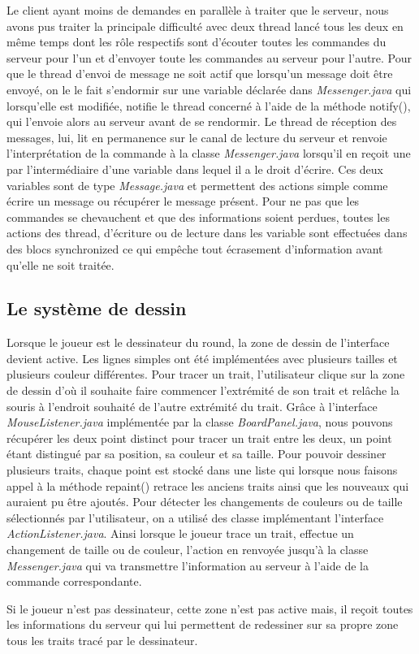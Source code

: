 \documentclass[a4paper, 11pt]{article}
\begin{document}
Le client ayant moins de demandes en parallèle à traiter que le
serveur, nous avons pus traiter la principale difficulté avec deux
thread lancé tous les deux en même temps dont les rôle respectifs sont
d'écouter toutes les commandes du serveur pour l'un et d'envoyer toute
les commandes au serveur pour l'autre.  Pour que le thread d'envoi de
message ne soit actif que lorsqu'un message doit être envoyé, on le le
fait s'endormir sur une variable déclarée dans \textit{Messenger.java}
qui lorsqu'elle est modifiée, notifie le thread concerné à l'aide de
la méthode notify(), qui l'envoie alors au serveur avant de se
rendormir.  Le thread de réception des messages, lui, lit en
permanence sur le canal de lecture du serveur et renvoie
l'interprétation de la commande à la classe \textit{Messenger.java}
lorsqu'il en reçoit une par l'intermédiaire d'une variable dans lequel
il a le droit d'écrire.  Ces deux variables sont de type
\textit{Message.java} et permettent des actions simple comme écrire un
message ou récupérer le message présent.  Pour ne pas que les
commandes se chevauchent et que des informations soient perdues,
toutes les actions des thread, d'écriture ou de lecture dans les
variable sont effectuées dans des blocs synchronized ce qui empêche
tout écrasement d'information avant qu'elle ne soit traitée.

\subsection{Le système de dessin}

Lorsque le joueur est le dessinateur du round, la zone de dessin de
l'interface devient active. Les lignes simples ont été implémentées
avec plusieurs tailles et plusieurs couleur différentes. Pour tracer
un trait, l'utilisateur clique sur la zone de dessin d'où il souhaite
faire commencer l’extrémité de son trait et relâche la souris à
l'endroit souhaité de l'autre extrémité du trait.  Grâce à l'interface
\textit{MouseListener.java} implémentée par la classe
\textit{BoardPanel.java}, nous pouvons récupérer les deux point
distinct pour tracer un trait entre les deux, un point étant distingué
par sa position, sa couleur et sa taille.  Pour pouvoir dessiner
plusieurs traits, chaque point est stocké dans une liste qui lorsque
nous faisons appel à la méthode repaint() retrace les anciens traits
ainsi que les nouveaux qui auraient pu être ajoutés.  Pour détecter
les changements de couleurs ou de taille sélectionnés par
l'utilisateur, on a utilisé des classe implémentant l'interface
\textit{ActionListener.java}.  Ainsi lorsque le joueur trace un trait,
effectue un changement de taille ou de couleur, l'action en renvoyée
jusqu'à la classe \textit{Messenger.java} qui va transmettre
l'information au serveur à l'aide de la commande correspondante.

Si le joueur n'est pas dessinateur, cette zone n'est pas active mais,
il reçoit toutes les informations du serveur qui lui permettent de
redessiner sur sa propre zone tous les traits tracé par le
dessinateur.
\end{document}
